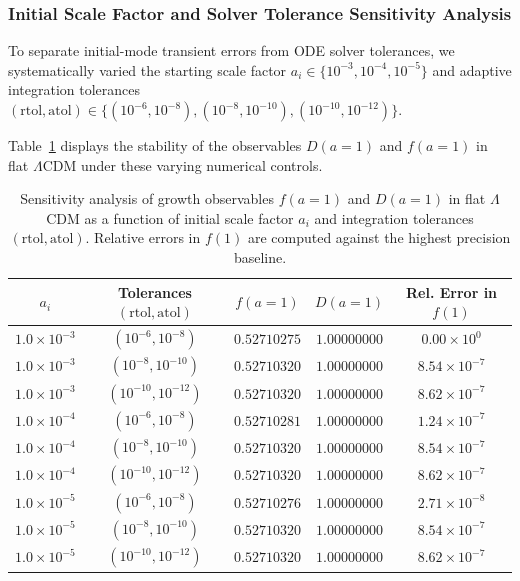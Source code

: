 \subsubsection{Initial Scale Factor and Solver Tolerance Sensitivity Analysis}

To separate initial-mode transient errors from ODE solver tolerances, we systematically varied the starting scale factor $a_i \in \{10^{-3}, 10^{-4}, 10^{-5}\}$ and adaptive integration tolerances $(\mathrm{rtol}, \mathrm{atol}) \in \{(10^{-6}, 10^{-8}), (10^{-8}, 10^{-10}), (10^{-10}, 10^{-12})\}$.

Table~\ref{tab:sensitivity_analysis} displays the stability of the observables $D(a=1)$ and $f(a=1)$ in flat $\Lambda$CDM under these varying numerical controls.
    \begin{table}[htbp]
        \centering
        \caption{Sensitivity analysis of growth observables $f(a=1)$ and $D(a=1)$ in flat $\Lambda$CDM as a function of initial scale factor $a_i$ and integration tolerances $(\mathrm{rtol}, \mathrm{atol})$. 
        Relative errors in $f(1)$ are computed against the highest precision baseline.}
        \label{tab:sensitivity_analysis}
        \begin{tabular}{ccccc}
            \hline\hline
            $a_i$ & \textbf{Tolerances} $(\mathrm{rtol}, \mathrm{atol})$ & $f(a=1)$ & $D(a=1)$ & \textbf{Rel. Error in } $f(1)$ \\
            \hline
            $1.0 \times 10^{-3}$ & $(10^{-6}, 10^{-8})$  & $0.52710275$ & $1.00000000$ & $0.00 \times 10^0$ \\
            $1.0 \times 10^{-3}$ & $(10^{-8}, 10^{-10})$ & $0.52710320$ & $1.00000000$ & $8.54 \times 10^{-7}$ \\
            $1.0 \times 10^{-3}$ & $(10^{-10}, 10^{-12})$& $0.52710320$ & $1.00000000$ & $8.62 \times 10^{-7}$ \\
            \hline
            $1.0 \times 10^{-4}$ & $(10^{-6}, 10^{-8})$  & $0.52710281$ & $1.00000000$ & $1.24 \times 10^{-7}$ \\
            $1.0 \times 10^{-4}$ & $(10^{-8}, 10^{-10})$ & $0.52710320$ & $1.00000000$ & $8.54 \times 10^{-7}$ \\
            $1.0 \times 10^{-4}$ & $(10^{-10}, 10^{-12})$& $0.52710320$ & $1.00000000$ & $8.62 \times 10^{-7}$ \\
            \hline
            $1.0 \times 10^{-5}$ & $(10^{-6}, 10^{-8})$  & $0.52710276$ & $1.00000000$ & $2.71 \times 10^{-8}$ \\
            $1.0 \times 10^{-5}$ & $(10^{-8}, 10^{-10})$ & $0.52710320$ & $1.00000000$ & $8.54 \times 10^{-7}$ \\
            $1.0 \times 10^{-5}$ & $(10^{-10}, 10^{-12})$& $0.52710320$ & $1.00000000$ & $8.62 \times 10^{-7}$ \\
            \hline\hline
        \end{tabular}
    \end{table}
    
